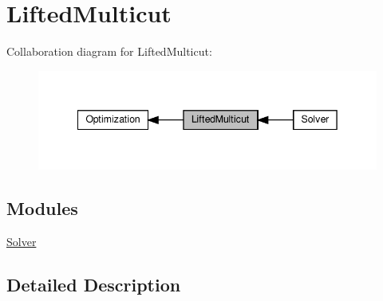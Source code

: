 \hypertarget{group__group__lifted__multicut}{}\section{Lifted\+Multicut}
\label{group__group__lifted__multicut}
Collaboration diagram for Lifted\+Multicut\+:
\nopagebreak
\begin{figure}[H]
\begin{center}
\leavevmode
\includegraphics[width=342pt]{group__group__lifted__multicut}
\end{center}
\end{figure}
\subsection*{Modules}
\begin{DoxyCompactItemize}
\item 
\hyperlink{group__group__lifted__multicut__solver}{Solver}
\end{DoxyCompactItemize}


\subsection{Detailed Description}
